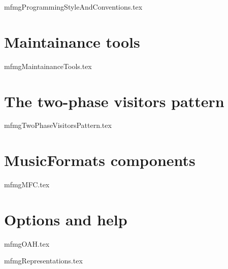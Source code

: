 \documentclass[11pt,a4paper]{report}
\begin{document}
{mfmgProgrammingStyleAndConventions.tex}


\part{Maintainance tools}

{mfmgMaintainanceTools.tex}


\part{The two-phase visitors pattern}

{mfmgTwoPhaseVisitorsPattern.tex}


\part{MusicFormats components}

{mfmgMFC.tex}


\part{Options and help}

{mfmgOAH.tex}



{mfmgRepresentations.tex}
%
%
%
%
%
%
%
\end{document}
